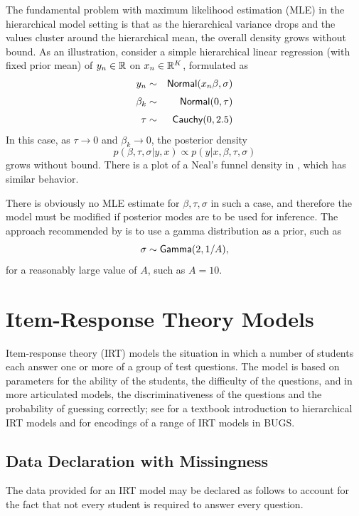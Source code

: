 The fundamental problem with maximum likelihood estimation (MLE) in
the hierarchical model setting is that as the hierarchical variance
drops and the values cluster around the hierarchical mean, the overall
density grows without bound.  As an illustration, consider a simple
hierarchical linear regression (with fixed prior mean) of $y_n \in
\reals$ on $x_n \in \reals^K$, formulated as
%
\begin{eqnarray*}
y_n & \sim & \distro{Normal}(x_n \beta, \sigma)
\\[3pt]
\beta_k & \sim & \distro{Normal}(0,\tau)
\\[3pt]
\tau & \sim & \distro{Cauchy}(0,2.5)
\end{eqnarray*}
%
In this case, as $\tau \rightarrow 0$ and $\beta_k \rightarrow 0$, the
posterior density
\[
p(\beta,\tau,\sigma|y,x) \propto p(y|x,\beta,\tau,\sigma)
\]
grows without bound.  There is a plot of a Neal's funnel density in
, which has similar behavior.

There is obviously no MLE estimate for $\beta,\tau,\sigma$ in such a
case, and therefore the model must be modified if posterior modes are
to be used for inference.  The approach recommended by
\cite{ChungEtAl:2013} is to use a gamma distribution as a prior, such
as
%
\[
\sigma \sim \distro{Gamma}(2, 1/A),
\]
%
for a reasonably large value of $A$, such as $A = 10$.


\section{Item-Response Theory Models}\label{item-response-models.section}

Item-response theory (IRT) models the situation in which a number of
students each answer one or more of a group of test questions.  The
model is based on parameters for the ability of the students, the
difficulty of the questions, and in more articulated models, the
discriminativeness of the questions and the probability of guessing
correctly; see \citep[pps.~314--320]{GelmanHill:2007} for a textbook
introduction to hierarchical IRT models and \citep{Curtis:2010} for
encodings of a range of IRT models in BUGS.


\subsection{Data Declaration with Missingness}

The data provided for an IRT model may be declared as follows
to account for the fact that not every student is required to answer
every question.
%

